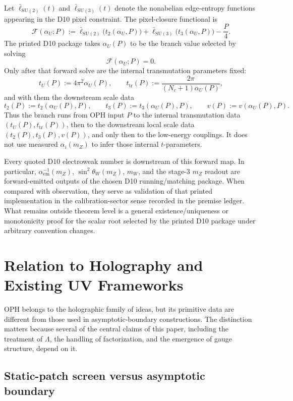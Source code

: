 \documentclass[11pt]{article}
\newcommand{\SU}{\mathrm{SU}}
\begin{document}
Let \(\bar\ell_{\SU(2)}(t)\) and \(\bar\ell_{\SU(3)}(t)\) denote the nonabelian edge-entropy functions appearing in the D10 pixel constraint. The pixel-closure functional is
\[
\mathcal F(\alpha_U;P)
:=
\bar\ell_{\SU(2)}\!\bigl(t_2(\alpha_U,P)\bigr)
+
\bar\ell_{\SU(3)}\!\bigl(t_3(\alpha_U,P)\bigr)
-\frac{P}{4}.
\]
The printed D10 package takes \(\alpha_U(P)\) to be the branch value selected by solving
\[
\mathcal F(\alpha_U;P)=0.
\]
Only after that forward solve are the internal transmutation parameters fixed:
\[
t_U(P):=4\pi^2\alpha_U(P),
\qquad
t_{\mathrm{tr}}(P):=\frac{2\pi}{(N_c+1)\alpha_U(P)},
\]
and with them the downstream scale data
\[
t_2(P):=t_2(\alpha_U(P),P),
\qquad
t_3(P):=t_3(\alpha_U(P),P),
\qquad
v(P):=v(\alpha_U(P),P).
\]
Thus the branch runs from OPH input \(P\) to the internal transmutation data
\((t_U(P),t_{\mathrm{tr}}(P))\), then to the downstream local scale data
\((t_2(P),t_3(P),v(P))\), and only then to the low-energy couplings. It does not use measured
\(\alpha_i(m_Z)\) to infer those internal \(t\)-parameters.

Every quoted D10 electroweak number is downstream of this forward map. In particular, \(\alpha_{\mathrm{em}}^{-1}(m_Z)\), \(\sin^2\theta_W(m_Z)\), \(m_W\), and the stage-3 \(m_Z\) readout are forward-emitted outputs of the chosen D10 running/matching package. When compared with observation, they serve as validation of that printed implementation in the calibration-sector sense recorded in the premise ledger. What remains outside theorem level is a general existence/uniqueness or monotonicity proof for the scalar root selected by the printed D10 package under arbitrary convention changes.

\section{Relation to Holography and Existing UV Frameworks}

OPH belongs to the holographic family of ideas, but its primitive data are different from those used in asymptotic-boundary constructions. The distinction matters because several of the central claims of this paper, including the treatment of $\Lambda$, the handling of factorization, and the emergence of gauge structure, depend on it.

\subsection{Static-patch screen versus asymptotic boundary}
\end{document}

